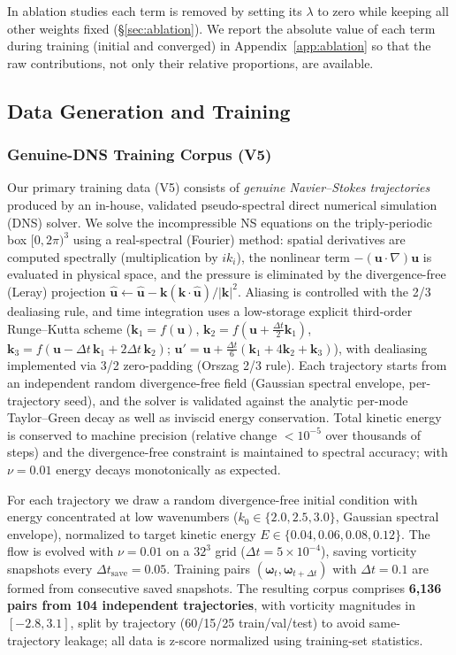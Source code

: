 \documentclass[review]{elsarticle}
\begin{document}
In ablation studies each term is removed by setting its $\lambda$ to zero while keeping all
other weights fixed (\S\ref{sec:ablation}). We report the absolute value of each term during
training (initial and converged) in Appendix~\ref{app:ablation} so that the raw contributions,
not only their relative proportions, are available.

\subsection{Data Generation and Training}
\label{sec:data}

\subsubsection{Genuine-DNS Training Corpus (V5)}

Our primary training data (V5) consists of \emph{genuine Navier--Stokes trajectories} produced by an in-house, validated pseudo-spectral direct numerical simulation (DNS) solver. We solve the incompressible NS equations on the triply-periodic box $[0,2\pi)^3$ using a real-spectral (Fourier) method: spatial derivatives are computed spectrally (multiplication by $ik_i$), the nonlinear term $-(\bm u\cdot\nabla)\bm u$ is evaluated in physical space, and the pressure is eliminated by the divergence-free (Leray) projection $\hat{\bm u}\leftarrow\hat{\bm u}-\bm k(\bm k\cdot\hat{\bm u})/|\bm k|^2$. Aliasing is controlled with the 2/3 dealiasing rule, and time integration uses a low-storage explicit third-order Runge--Kutta scheme ($\bm k_1=f(\bm u)$, $\bm k_2=f(\bm u+\tfrac{\Delta t}{2}\bm k_1)$, $\bm k_3=f(\bm u-\Delta t\,\bm k_1+2\Delta t\,\bm k_2)$; $\bm u'=\bm u+\tfrac{\Delta t}{6}(\bm k_1+4\bm k_2+\bm k_3)$), with dealiasing implemented via 3/2 zero-padding (Orszag 2/3 rule). Each trajectory starts from an independent random divergence-free field (Gaussian spectral envelope, per-trajectory seed), and the solver is validated against the analytic per-mode Taylor--Green decay as well as inviscid energy conservation. Total kinetic energy is conserved to machine precision (relative change $<10^{-5}$ over thousands of steps) and the divergence-free constraint is maintained to spectral accuracy; with $\nu{=}0.01$ energy decays monotonically as expected.

For each trajectory we draw a random divergence-free initial condition with energy concentrated at low wavenumbers ($k_0\in\{2.0,2.5,3.0\}$, Gaussian spectral envelope), normalized to target kinetic energy $E\in\{0.04,0.06,0.08,0.12\}$. The flow is evolved with $\nu{=}0.01$ on a $32^3$ grid ($\Delta t{=}5\times10^{-4}$), saving vorticity snapshots every $\Delta t_{\text{save}}{=}0.05$. Training pairs $(\bm\omega_t,\bm\omega_{t+\Delta t})$ with $\Delta t{=}0.1$ are formed from consecutive saved snapshots. The resulting corpus comprises \textbf{6,136 pairs from 104 independent trajectories}, with vorticity magnitudes in $[-2.8,3.1]$, split by trajectory (60/15/25 train/val/test) to avoid same-trajectory leakage; all data is z-score normalized using training-set statistics.
\end{document}
